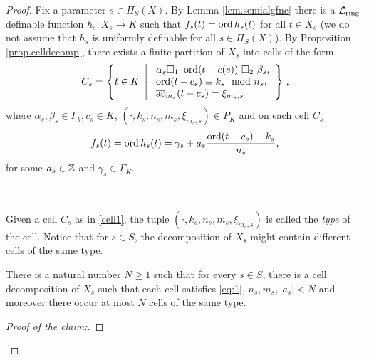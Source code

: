 \begin{proof}

Fix a parameter $s \in \Pi_S(X)$. By Lemma \ref{lem.semialgfnc} there is a $\mathcal{L}_{\text{ring}}$-definable function {$h_s: X_s\to K$} such that $f_s(t) = \operatorname{ord} h_s(t)$ for all $t \in X_s$ (we do not assume that $h_s$ is uniformly definable for all $s\in \Pi_S(X)$). By Proposition \ref{prop.celldecomp}, there exists a finite partition of $X_s$ into cells of the form 
\begin{equation}\label{cell1}
C_s = \left\{t \in K \ \left| \ \begin{array}{l} \alpha_s \square_1 \ \ord(t-c(s)) \ \square_2 \ \beta_s,\\ \ord(t-c_s) \equiv k_s\mod n_s,\\ \ac_{m_s}(t-c_s) = \xi_{m_s,s} \end{array} \right\}\right.,
\end{equation}
where $\alpha_s, \beta_s \in \Gamma_k, c_s \in K$, $(\square,k_s, n_s, m_s,\xi_{m_s,s})\in P_K$ and on each cell $C_s$ 
\begin{equation}\label{preparation}
f_s(t)=\operatorname{ord} h_s(t) =\gamma_s + a_s\frac{\operatorname{ord}(t-c_s)-k_s}{n_s},
\end{equation}
for some $a_s\in {\mathbb Z}$ and $\gamma_s\in \Gamma_K$.

\

Given a cell $C_s$ as in \ref{cell1}, the tuple $(\square,k_s,n_s,m_s,\xi_{m_s,s})$ is called the \emph{type} of the cell. Notice that for $s\in S$, the decomposition of $X_s$ might contain different cells of the same type. 

\begin{claim} 
There is a natural number $N\geq 1$ such that for every $s\in S$, there is a cell decomposition of $X_s$ such that each cell satisfies \ref{eq:1}, $n_s,m_s,|a_s|<N$ and moreover there occur at most $N$ cells of the same type.
\end{claim}

\begin{proof}[Proof of the claim:]


\end{proof}
\end{proof}
